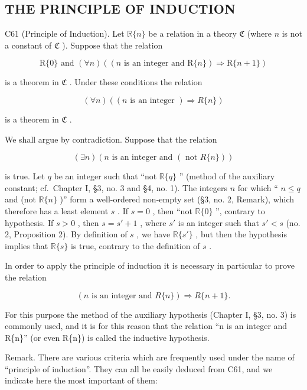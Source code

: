 \subsection{THE PRINCIPLE OF INDUCTION}

C61 (Principle of Induction). Let \(\mathbb{R}\{n\}\) be a relation in a theory \(\mathfrak{C}\) (where \(n\) is not a constant of \(\mathfrak{C}\) ). Suppose that the relation

\[
\mathrm{R} \{0 \} \text { and } (\forall n) ((n \text { is   an   integer   and } \mathrm{R} \{n \}) \Longrightarrow \mathrm{R} \{n + 1 \})
\]

is a theorem in \(\mathfrak{C}\) . Under these conditions the relation

\[
(\forall n) ((n \text {   is   an   integer   }) \Longrightarrow R \{n \})
\]

is a theorem in \(\mathfrak{C}\) .

We shall argue by contradiction. Suppose that the relation

\[
(\exists n) (n \text {   is   an   integer   and   } (\text { not   } R \{n \}))
\]

is true. Let \(q\) be an integer such that ``not \(\mathbb{R}\{q\}\) '' (method of the auxiliary constant; cf.~Chapter I, §3, no. 3 and §4, no. 1). The integers \(n\) for which `` \(n \leqslant q\) and (not \(\mathbb{R}\{n\}\) )'' form a well-ordered non-empty set (§3, no. 2, Remark), which therefore has a least element \(s\) . If \(s = 0\) , then ``not \(\mathbb{R}\{0\}\) '', contrary to hypothesis. If \(s > 0\) , then \(s = s' + 1\) , where \(s'\) is an integer such that \(s' < s\) (no. 2, Proposition 2). By definition of \(s\) , we have \(\mathbb{R}\{s'\}\) , but then the hypothesis implies that \(\mathbb{R}\{s\}\) is true, contrary to the definition of \(s\) .

In order to apply the principle of induction it is necessary in particular to prove the relation

\[
(n \text {   is   an   integer   and   } R \{n \}) \Longrightarrow R \{n + 1 \}.
\]

For this purpose the method of the auxiliary hypothesis (Chapter I, §3, no. 3) is commonly used, and it is for this reason that the relation ``n is an integer and R\{n\}'' (or even R\{n\}) is called the inductive hypothesis.

Remark. There are various criteria which are frequently used under the name of ``principle of induction''. They can all be easily deduced from C61, and we indicate here the most important of them:

